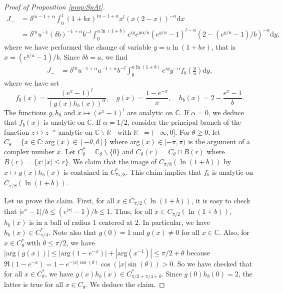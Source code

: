 \documentclass[10pt,a4paper]{amsart}
\newcommand{\C}{\mathds{C}}
\newcommand{\R}{\mathds{R}}
\renewcommand{\d}{\mathrm{d}}
\begin{document}
\begin{proof}[Proof of Proposition \ref{prop:SpAt}]
	\begin{align*}
		J_- &=  \delta^{iu - 1 + \alpha} \int_{0}^{1} ( 1+ b x )^{iu - 1 + \alpha} x^l ( x(2- x))^{ -\alpha } \d x  \\
		& = \delta^{iu} u^{-1} (\delta b)^{-1 + \alpha } b ^{-l} \int_{0}^{u \ln (1 + b)} e^{iy } e^{y \alpha / u }  (e^{y/u} -1)^{l - \alpha}  (2-(e^{y/u} -1)/b )^{- \alpha } \d y,
	\end{align*}
	where we have performed the change of variable $y = u \ln ( 1 + bx)$, that is $x = (e^{y/u} -1)/b$. Since $\delta b = a$, we find
	\begin{align*}
		J_- 
		& = \delta^{iu} u^{-1+\alpha} a^{-1 + \alpha } b ^{-l} \int_{0}^{u \ln (1 + b)} e^{iy} y^{-\alpha} f_b\left(\frac y u \right) \d y,
	\end{align*}
	where we have set 
	$$
	f_b(x) =  \frac{(e^{x} -1)^{l} }{ \left( g(x)  h_b(x) \right)^{\alpha} }, \quad g(x) =  \frac{1-e^{-x} }{x} , \quad h_b(x) =  2 - \frac{e^{x} -1}{b}.
	$$		
	The functions $g,h_b$ and $x \mapsto (e^x-1)^l$ are analytic on $\C$. If $\alpha = 0$, we deduce that $f_b(x)$ is analytic on $\C$. If $\alpha = 1/2$, consider the principal branch of the function $z \mapsto z^{-\alpha}$ analytic on $\C \backslash \R^-$ with $\R^- = (-\infty,0]$.  For $\theta \geq 0$, let $C_\theta = \{ x \in \C : \mathrm{arg} (x) \in [-\theta,\theta] \}$ where $\mathrm{arg}(x) \in [-\pi,\pi)$ is the argument of a complex number $x$. Let $C^*_\theta = \C_\theta \backslash \{0\}$ and $C_\theta (r) = C_\theta \cap B(r)$ where $B(r) = \{ x : |x| \leq r\}$. We claim that the image of $C_{\pi/8}  (\ln (1+b))$ by $x \mapsto g(x)  h_b(x)$ is contained in $C^*_{7\pi / 8}$. This claim implies that  $f_b$ is analytic on $C_{\pi/8}  (\ln (1+b))$.

Let us prove the claim. First, for all $x \in C_{\pi/2} ( \ln(1+b))$, it is easy to check that  $|e^x - 1|/b \leq (e^{|x|} - 1 ) / b \leq 1$. Thus, for all $x \in C_{\pi/2} ( \ln(1+b))$, $h_b(x)$ is in a ball of radius $1$ centered at $2$. In particular, we have $h_b(x) \in C^*_{\pi/4}$. Note also that $g(0) = 1$ and $g(x) \ne 0$ for all $x \in \C$. Also, for $ x \in C^*_\theta$ with $\theta \leq \pi/2$, we have $|\mathrm{arg} (g(x))| \leq |\mathrm{arg} (1 - e^{-x})| + |\mathrm{arg} (x^{-1})| \leq \pi / 2 + \theta$ because $\Re(1 - e^{-x}) = 1 -e^{-|x| \cos (\theta)} \cos (|x| \sin (\theta))  >0$. So we have checked that for all $x \in C^*_\theta$, we have $g(x)  h_b(x) \in C^*_{\pi/2 + \pi/4 + \theta}$. Since $g(0)  h_b(0) = 2$, the latter is true for all $x \in C_\theta$. We deduce the claim. 



\end{proof}
\end{document}
